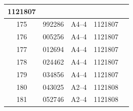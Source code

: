 \documentclass[UTF8,10pt,a4paper,fontset=fandol]{ctexart}
\newcommand{\fieldvalue}[1]{#1}
\begin{document}
\begin{tabularx}{\textwidth}{|c|c|c|c|X|}
\fieldvalue{1121807} & \\ \hline
\fieldvalue{175} &
\fieldvalue{992286} &
\fieldvalue{A4--4} &
\fieldvalue{1121807} & \\ \hline
\fieldvalue{176} &
\fieldvalue{005256} &
\fieldvalue{A4--4} &
\fieldvalue{1121807} & \\ \hline
\fieldvalue{177} &
\fieldvalue{012694} &
\fieldvalue{A4--4} &
\fieldvalue{1121807} & \\ \hline
\fieldvalue{178} &
\fieldvalue{024462} &
\fieldvalue{A4--4} &
\fieldvalue{1121807} & \\ \hline
\fieldvalue{179} &
\fieldvalue{034856} &
\fieldvalue{A4--4} &
\fieldvalue{1121807} & \\ \hline
\fieldvalue{180} &
\fieldvalue{043025} &
\fieldvalue{A2--4} &
\fieldvalue{1121808} & \\ \hline
\fieldvalue{181} &
\fieldvalue{052746} &
\fieldvalue{A2--4} &
\fieldvalue{1121808} & \\ \hline

\end{tabularx}
\end{document}
